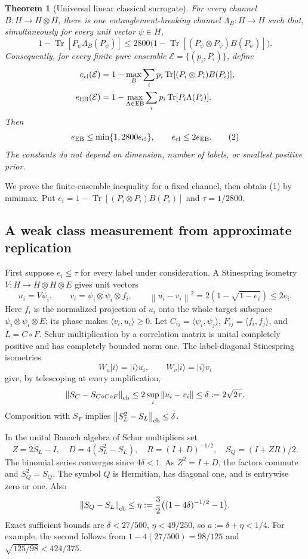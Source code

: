 \documentclass[11pt]{article}
\newtheorem{theorem}{Theorem}
\newcommand{\Tr}{\operatorname{Tr}}
\newcommand{\EB}{\operatorname{EB}}
\newcommand{\norm}[1]{\left\lVert#1\right\rVert}
\begin{document}
\begin{theorem}[Universal linear classical surrogate]\label{thm:surrogate}
For every channel $B:H\to H\otimes H$, there is one entanglement-breaking channel $\Lambda_B:H\to H$ such that, simultaneously for every unit vector $\psi\in H$,
\[
1-\Tr[P_\psi\Lambda_B(P_\psi)]
\le 2800\bigl(1-\Tr[(P_\psi\otimes P_\psi)B(P_\psi)]\bigr).
\tag{1}
\]
Consequently, for every finite pure ensemble $\mathcal E=\{(p_i,P_i)\}$, define
\begin{align*}
e_{\rm cl}(\mathcal E)&=1-\max_B\sum_i p_i\Tr[(P_i\otimes P_i)B(P_i)],\\
e_{\EB}(\mathcal E)&=1-\max_{\Lambda\in\EB}\sum_i p_i\Tr[P_i\Lambda(P_i)].
\end{align*}
Then
\[
e_{\EB}\le \min\{1,2800 e_{\rm cl}\},\qquad e_{\rm cl}\le 2e_{\EB}.
\tag{2}
\]
The constants do not depend on dimension, number of labels, or smallest positive prior.
\end{theorem}

We prove the finite-ensemble inequality for a fixed channel, then obtain (1) by minimax. Put $e_i=1-\Tr[(P_i\otimes P_i)B(P_i)]$ and $\tau=1/2800$.

\subsection{A weak class measurement from approximate replication}

First suppose $e_i\le\tau$ for every label under consideration. A Stinespring isometry $V:H\to H\otimes H\otimes E$ gives unit vectors
\[
u_i=V\psi_i,\qquad v_i=\psi_i\otimes\psi_i\otimes f_i,
\qquad \norm{u_i-v_i}^2=2(1-\sqrt{1-e_i})\le2e_i.
\]
Here $f_i$ is the normalized projection of $u_i$ onto the whole target subspace $\psi_i\otimes\psi_i\otimes E$; its phase makes $\langle v_i,u_i\rangle\ge0$.
Let $C_{ij}=\langle\psi_i,\psi_j\rangle$, $F_{ij}=\langle f_i,f_j\rangle$, and $L=C\circ F$. Schur multiplication by a correlation matrix is unital completely positive and has completely bounded norm one. The label-diagonal Stinespring isometries
\[
W_u|i\rangle=|i\rangle u_i,\qquad W_v|i\rangle=|i\rangle v_i
\]
give, by telescoping at every amplification,
\[
\norm{S_C-S_{C\circ C\circ F}}_{\rm cb}\le2\sup_i\norm{u_i-v_i}
\le\delta:=2\sqrt{2\tau}.
\]
Composition with $S_F$ implies $\norm{S_L^2-S_L}_{\rm cb}\le\delta$.

In the unital Banach algebra of Schur multipliers set
\[
Z=2S_L-I,\quad D=4(S_L^2-S_L),\quad
R=(I+D)^{-1/2},\quad S_Q=(I+ZR)/2.
\]
The binomial series converges since $4\delta<1$. As $Z^2=I+D$, the factors commute and $S_Q^2=S_Q$. The symbol $Q$ is Hermitian, has diagonal one, and is entrywise zero or one. Also
\[
\norm{S_Q-S_L}_{\rm cb}\le
\eta:=\frac32\bigl((1-4\delta)^{-1/2}-1\bigr).
\]
Exact sufficient bounds are $\delta<27/500$, $\eta<49/250$, so $a:=\delta+\eta<1/4$. For example, the second follows from
$1-4(27/500)=98/125$ and $\sqrt{125/98}<424/375$.
\end{document}
